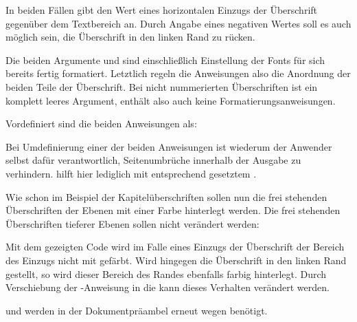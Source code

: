 In beiden Fällen gibt  den Wert eines horizontalen Einzugs
der Überschrift gegenüber dem Textbereich an. Durch Angabe eines negativen
Wertes soll es auch möglich sein, die Überschrift in den linken Rand zu
rücken.

Die beiden Argumente  und  sind einschließlich
Einstellung der Fonts für sich bereits fertig formatiert. Letztlich regeln die
Anweisungen also die Anordnung der beiden Teile der Überschrift. Bei nicht
nummerierten Überschriften ist  ein komplett leeres Argument,
enthält also auch keine Formatierungsanweisungen.

Vordefiniert sind die beiden Anweisungen als:
\begin{lstcode}
\newcommand{\sectionlinesformat}[4]{%
  \@hangfrom{\hskip #2#3}{#4}%
}
\newcommand{\sectioncatchphraseformat}[4]{\hskip #2#3#4}
\end{lstcode}

Bei Umdefinierung einer der beiden Anweisungen ist wiederum der Anwender
selbst dafür verantwortlich, Seitenumbrüche innerhalb der Ausgabe zu
verhindern. \KOMAScript{} hilft hier lediglich mit entsprechend gesetztem
.

\begin{Example}
  Wie schon im Beispiel der Kapitelüberschriften sollen nun die frei stehenden
  Überschriften der Ebenen  mit einer Farbe hinterlegt
  werden. Die frei stehenden Überschriften tieferer Ebenen sollen nicht
  verändert werden:
\begin{lstcode}[moretexcs={colorbox}]
  \makeatletter
  \renewcommand{\sectionlinesformat}[4]{%
    \ifstr{#1}{section}{%
      \hspace*{#2}%
      \colorbox{yellow}{%
        \parbox{\dimexpr\linewidth
                        -2\fboxrule-2\fboxsep-#2}{%
          \raggedsection
          \@hangfrom{#3}{#4}%
        }%
      }%
    }{%
      \@hangfrom{\hskip #2#3}{#4}%
    }%
  }
  \makeatother
\end{lstcode}
  Mit dem gezeigten Code wird im Falle eines Einzugs der Überschrift der
  Bereich des Einzugs nicht mit gefärbt. Wird hingegen die Überschrift in den
  linken Rand gestellt, so wird dieser Bereich des Randes ebenfalls farbig
  hinterlegt. Durch Verschiebung der -Anweisung in die
   kann dieses Verhalten verändert werden.%
  \iffalse Umbruchkorrekturtext
  
  Erneut sei daran erinnert, dass \Macro{makeatletter} und \Macro{makeatother}
  nur in der Dokumentpräambel zu verwenden sind. In einer eigenen
  Wrapper-Klasse oder einem Paket haben sie zu entfallen. Sie werden auch nur
  wegen \Macro{@hangfrom} in der Definition von \Macro{sectionlinesformat}
  benötigt.%
  \else%

   und  werden in der Dokumentpräambel
  erneut wegen  benötigt.%
  \fi%
\end{Example}

